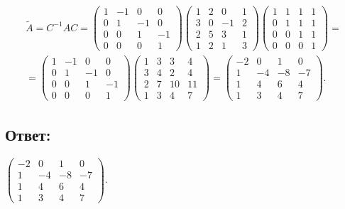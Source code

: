 \documentclass[12pt]{article}
\begin{document}
    \begin{multline*}
        \widetilde{A}
        = C^{-1} A C
        =
        \begin{pmatrix}
            1 & -1 & 0  & 0  \\
            0 & 1  & -1 & 0  \\
            0 & 0  & 1  & -1 \\
            0 & 0  & 0  & 1
        \end{pmatrix}
        \begin{pmatrix}
            1 & 2 & 0  & 1 \\
            3 & 0 & -1 & 2 \\
            2 & 5 & 3  & 1 \\
            1 & 2 & 1  & 3
        \end{pmatrix}
        \begin{pmatrix}
            1 & 1 & 1 & 1 \\
            0 & 1 & 1 & 1 \\
            0 & 0 & 1 & 1 \\
            0 & 0 & 0 & 1
        \end{pmatrix} = \\
        =
        \begin{pmatrix}
            1 & -1 & 0  & 0  \\
            0 & 1  & -1 & 0  \\
            0 & 0  & 1  & -1 \\
            0 & 0  & 0  & 1
        \end{pmatrix}
        \begin{pmatrix}
            1 & 3 & 3  & 4  \\
            3 & 4 & 2  & 4  \\
            2 & 7 & 10 & 11 \\
            1 & 3 & 4  & 7
        \end{pmatrix}
        =
        \begin{pmatrix}
            -2 & 0  & 1  & 0  \\
            1  & -4 & -8 & -7 \\
            1  & 4  & 6  & 4  \\
            1  & 3  & 4  & 7
        \end{pmatrix} .
    \end{multline*}

    \subsection*{Ответ:}
    $
    \begin{pmatrix}
        -2 & 0  & 1  & 0  \\
        1  & -4 & -8 & -7 \\
        1  & 4  & 6  & 4  \\
        1  & 3  & 4  & 7
    \end{pmatrix} .
    $
\end{document}
